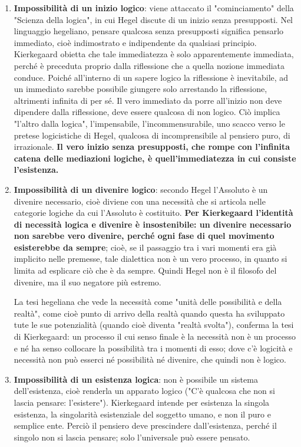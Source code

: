 \begin{enumerate}
	
	\item \textbf{Impossibilità di un inizio logico}: viene attaccato il "cominciamento" della "Scienza della logica", in cui Hegel discute di un inizio senza presupposti. Nel linguaggio hegeliano, pensare qualcosa senza presupposti significa pensarlo immediato, cioè indimostrato e indipendente da qualsiasi principio. Kierkegaard obietta che tale immediatezza è solo apparentemente immediata, perché è preceduta  proprio dalla riflessione che a quella nozione immediata conduce. Poiché all'interno di un sapere logico la riflessione è inevitabile, ad un immediato sarebbe possibile giungere solo arrestando la riflessione, altrimenti infinita di per sé. Il vero immediato da porre all'inizio non deve dipendere dalla riflessione, deve essere qualcosa di non logico. Ciò implica "l'altro dalla logica", l'impensabile, l'incommensurabile, uno scacco verso le pretese logicistiche di Hegel, qualcosa di incomprensibile al pensiero puro, di irrazionale.\textbf{ Il vero inizio senza presupposti, che rompe con l'infinita catena delle mediazioni logiche, è quell'immediatezza in cui consiste l'esistenza.}

	\item \textbf{Impossibilità di un divenire logico}: secondo Hegel l'Assoluto è un divenire necessario, cioè diviene con una necessità che si articola nelle categorie logiche da cui l'Assoluto è costituito. \textbf{Per Kierkegaard l'identità di necessità logica e divenire è insostenibile: un divenire necessario non sarebbe vero divenire, perché ogni fase di quel movimento esisterebbe da sempre}; cioè, se il passaggio tra i vari momenti era già implicito nelle premesse, tale dialettica non è un vero processo, in quanto si limita ad esplicare ciò che è da sempre. Quindi Hegel non è il filosofo del divenire, ma il suo negatore più estremo. 
	
	La tesi hegeliana che vede la necessità come "unità delle possibilità e della realtà", come cioè punto di arrivo della realtà quando questa ha sviluppato tute le sue potenzialità (quando cioè diventa "realtà svolta"), conferma la tesi di Kierkegaard: un processo il cui senso finale è la necessità non è un processo e né ha senso collocare la possibilità tra i momenti di esso; dove c'è logicità e necessità non può esserci né possibilità né divenire, che quindi non è logico.
	
	\item \textbf{Impossibilità di un esistenza logica}: non è possibile un sistema dell'esistenza, cioè renderla un apparato logico ("C'è qualcosa che non si lascia pensare: l'esistere"). Kierkegaard intende per esistenza la singola esistenza, la singolarità esistenziale del soggetto umano, e non il puro e semplice ente. Perciò il pensiero deve prescindere dall'esistenza, perché il singolo non si lascia pensare; solo l'universale può essere pensato.
	
\end{enumerate}

